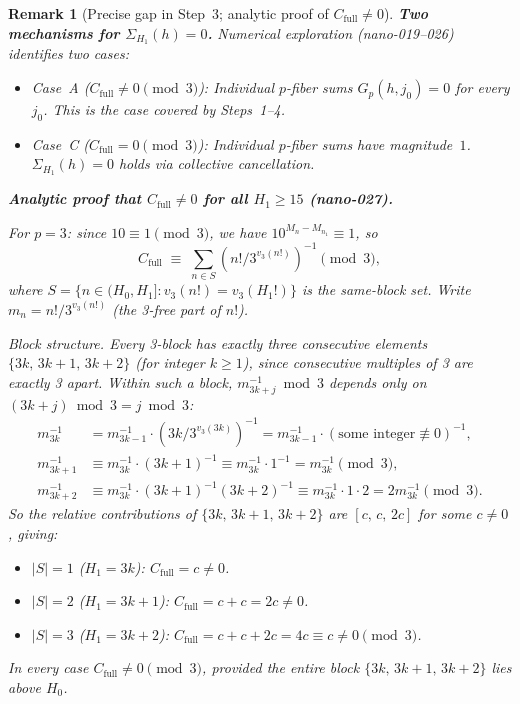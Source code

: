 \documentclass[
]{article}
\newtheorem{remark}[theorem]{Remark}
\begin{document}
\begin{remark}[Precise gap in Step~3; analytic proof of $C_{\mathrm{full}}\ne 0$]\label{rem:Cfull-gap}
\textbf{Two mechanisms for $\Sigma_{H_1}(h)=0$.}
Numerical exploration (nano-019--026) identifies two cases:
\begin{itemize}
\item \emph{Case~A} ($C_{\mathrm{full}}\ne 0\pmod 3$):
  Individual $p$-fiber sums $G_p(h,j_0)=0$ for every $j_0$.
  This is the case covered by Steps~1--4.
\item \emph{Case~C} ($C_{\mathrm{full}}=0\pmod 3$):
  Individual $p$-fiber sums have magnitude~$1$.
  $\Sigma_{H_1}(h)=0$ holds via collective cancellation.
\end{itemize}

\textbf{Analytic proof that $C_{\mathrm{full}}\ne 0$ for all $H_1\ge 15$ (nano-027).}

For $p=3$: since $10\equiv 1\pmod 3$, we have $10^{M_n-M_{n_1}}\equiv 1$, so
\[
  C_{\mathrm{full}} \;\equiv\; \sum_{n\in S} (n!/3^{v_3(n!)})^{-1} \pmod 3,
\]
where $S=\{n\in(H_0,H_1]:v_3(n!)=v_3(H_1!)\}$ is the same-block set.
Write $m_n = n!/3^{v_3(n!)}$ (the 3-free part of $n!$).

\emph{Block structure.}
Every 3-block has exactly three consecutive elements $\{3k,\,3k{+}1,\,3k{+}2\}$
(for integer $k\ge 1$), since consecutive multiples of 3 are exactly 3 apart.
Within such a block, $m_{3k+j}^{-1}\bmod 3$ depends only on $(3k+j)\bmod 3=j\bmod 3$:
\begin{align*}
  m_{3k}^{-1} &= m_{3k-1}^{-1}\cdot(3k/3^{v_3(3k)})^{-1} = m_{3k-1}^{-1}\cdot(\text{some integer}\not\equiv 0)^{-1},\\
  m_{3k+1}^{-1} &\equiv m_{3k}^{-1}\cdot(3k+1)^{-1}\equiv m_{3k}^{-1}\cdot 1^{-1}=m_{3k}^{-1} \pmod 3,\\
  m_{3k+2}^{-1} &\equiv m_{3k}^{-1}\cdot(3k+1)^{-1}(3k+2)^{-1}\equiv m_{3k}^{-1}\cdot 1\cdot 2=2m_{3k}^{-1} \pmod 3.
\end{align*}
So the relative contributions of $\{3k,\,3k{+}1,\,3k{+}2\}$ are $[c,\,c,\,2c]$ for some $c\ne 0$, giving:
\begin{itemize}
\item $|S|=1$ ($H_1=3k$): $C_{\mathrm{full}}=c\ne 0$.
\item $|S|=2$ ($H_1=3k{+}1$): $C_{\mathrm{full}}=c+c=2c\ne 0$.
\item $|S|=3$ ($H_1=3k{+}2$): $C_{\mathrm{full}}=c+c+2c=4c\equiv c\ne 0\pmod 3$.
\end{itemize}
In every case $C_{\mathrm{full}}\ne 0\pmod 3$, \emph{provided the entire block
$\{3k,\,3k{+}1,\,3k{+}2\}$ lies above $H_0$.}


\end{remark}
\end{document}
